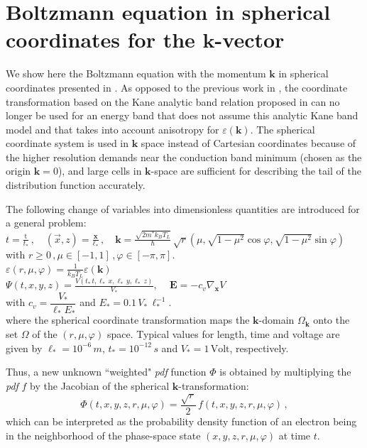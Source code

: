 \documentclass[11pt]{article}
\newcommand{\bk}{\mathbf{k}}
\newcommand{\bx}{\mathbf{x}}
\newcommand{\eps}{\varepsilon}
\newcommand{\bE}{\mathbf{E}}
\newcommand{\ti}{\mathrm{t}}
\newcommand{\nV}{\Psi}
\newcommand{\kbt}{k_B T_L}
\newcommand{\dm}{\displaystyle}
\newcommand{\cd}[1]{c_{#1}}
\newcommand{\domk}{\Omega_{\bk}}
\begin{document}
\section{Boltzmann equation in spherical coordinates for the $\bk$-vector}
%
We show here the Boltzmann equation with the momentum $\bk$ in spherical coordinates presented in 
\cite{CGMS-IWCE13}. As opposed to the previous work in \cite{CGMS-CMAME2008}, the coordinate 
transformation 
based on the Kane 
analytic band relation
proposed in \cite{MP} can no longer be used for an energy band that does not assume this analytic Kane band model and that takes into account anisotropy for $\varepsilon(\bk)$. The spherical 
coordinate system is used in
$\bk$ space instead of Cartesian coordinates because of the 
higher resolution demands near the conduction band minimum (chosen as the origin $\bk=0$), and 
large cells in $\bk$-space are sufficient for describing the tail of the distribution 
function accurately. 



The following change of variables into 
dimensionless quantities are introduced for a general problem:
%
\\[5pt]
$
\dm t = \frac{\ti}{t_*} \, , \quad
(\vec{x},z) = \frac{\bx}{\ell_*} \, , \quad
\bk = \frac{\sqrt{2 m^* \kbt}}{\hbar} \, \sqrt{r} \left( \mu,
\sqrt{1 - \mu^{2}} \cos \varphi,  \sqrt{1 - \mu^{2}} \sin
\varphi\right)
$
%
\\[5pt]
with $r \geq 0 \, , \mu \in [-1,1] \, , \varphi \in [-\pi, \pi]$.
%
\\[5pt]
$
\dm
\eps(r,\mu,\varphi) = \frac{1}{\kbt}  \varepsilon (\bk)
$
%
\\[5pt]
$
\dm \nV(t,x,y,z) = \frac{V(t_{*} \, t, \ell_* \, x, \ell_* \, y, \ell_* \, z)}{V_*} , \,
\quad \bE = - \cd{v} \nabla_{\bx} V  
$
%
\\[5pt]
%
with $\dm \cd{v} = \dfrac{V_*}{\ell_* E_*}$ and  $E_* = 0.1 \, V_* \, \ell_{*}^{-1}$.
\\[5pt]
%
where 
the spherical coordinate transformation maps the $\bk$-domain $\domk$ onto the
set $\Omega$ of the $(r, \mu, \varphi)$ space.
Typical values for length, time and voltage are given by
$\ell_* = 10^{-6} \, m$, $t_* = 10^{-12} \, s$ and $V_* = 1 \,
\mbox{Volt}$, respectively. 


Thus, a new unknown ``weighted" \emph{pdf} function $\Phi$ is obtained by multiplying the \emph{pdf} $f$
by the Jacobian of the spherical $\bk$-transformation:
%
\begin{equation}
\Phi(t,x,y,z,r,\mu,\varphi) = \frac{\sqrt{r}}{2} \, f(t,x,y,z,r,\mu,\varphi) \, ,
\end{equation}
which can be interpreted as the probability density function of an electron 
being in the neighborhood of the phase-space state $(x,y,z,r,\mu,\varphi)$ at time $t$.
\end{document}
